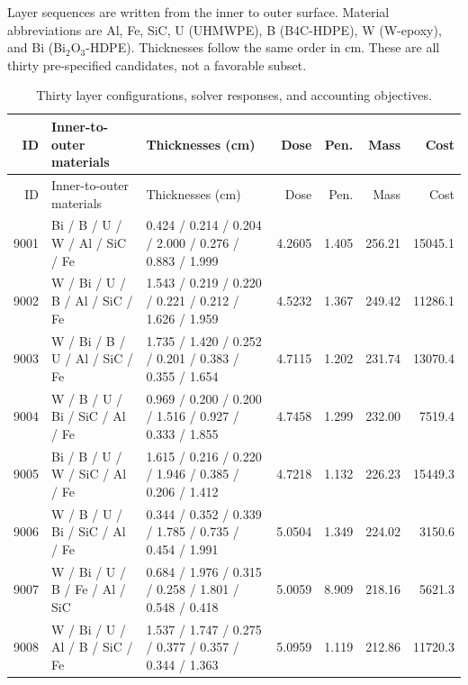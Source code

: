 Layer sequences are written from the inner to outer surface. Material abbreviations are Al, Fe, SiC, U (UHMWPE), B (B4C-HDPE), W (W-epoxy), and Bi (Bi$_2$O$_3$-HDPE). Thicknesses follow the same order in cm. These are all thirty pre-specified candidates, not a favorable subset.

\begin{landscape}\scriptsize\begin{longtable}{rllrrrr}

\caption{Thirty layer configurations, solver responses, and accounting objectives.}\\\toprule ID & Inner-to-outer materials & Thicknesses (cm) & Dose & Pen. & Mass & Cost\\\midrule\endfirsthead

\toprule ID & Inner-to-outer materials & Thicknesses (cm) & Dose & Pen. & Mass & Cost\\\midrule\endhead

9001 & Bi / B / U / W / Al / SiC / Fe & 0.424 / 0.214 / 0.204 / 2.000 / 0.276 / 0.883 / 1.999 & 4.2605 & 1.405 & 256.21 & 15045.1\\

9002 & W / Bi / U / B / Al / SiC / Fe & 1.543 / 0.219 / 0.220 / 0.221 / 0.212 / 1.626 / 1.959 & 4.5232 & 1.367 & 249.42 & 11286.1\\

9003 & W / Bi / B / U / Al / SiC / Fe & 1.735 / 1.420 / 0.252 / 0.201 / 0.383 / 0.355 / 1.654 & 4.7115 & 1.202 & 231.74 & 13070.4\\

9004 & W / B / U / Bi / SiC / Al / Fe & 0.969 / 0.200 / 0.200 / 1.516 / 0.927 / 0.333 / 1.855 & 4.7458 & 1.299 & 232.00 & 7519.4\\

9005 & Bi / B / U / W / SiC / Al / Fe & 1.615 / 0.216 / 0.220 / 1.946 / 0.385 / 0.206 / 1.412 & 4.7218 & 1.132 & 226.23 & 15449.3\\

9006 & W / B / U / Bi / SiC / Al / Fe & 0.344 / 0.352 / 0.339 / 1.785 / 0.735 / 0.454 / 1.991 & 5.0504 & 1.349 & 224.02 & 3150.6\\

9007 & W / Bi / U / B / Fe / Al / SiC & 0.684 / 1.976 / 0.315 / 0.258 / 1.801 / 0.548 / 0.418 & 5.0059 & 8.909 & 218.16 & 5621.3\\

9008 & W / Bi / U / Al / B / SiC / Fe & 1.537 / 1.747 / 0.275 / 0.377 / 0.357 / 0.344 / 1.363 & 5.0959 & 1.119 & 212.86 & 11720.3\\


\end{longtable}
\end{landscape}
